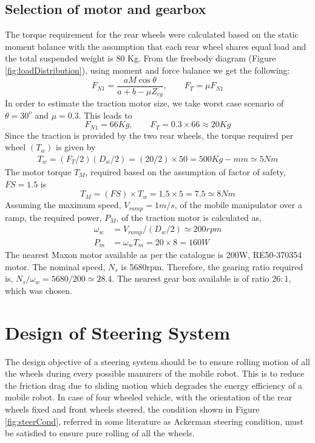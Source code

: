  \subsection {Selection of motor and gearbox}
 The torque requirement for the rear wheels were calculated based on the static moment balance with the assumption that each rear wheel shares equal load and the total suspended weight is 80 Kg. From the freebody diagram (Figure   \ref{fig:loadDistribution}), using moment and force balance  we get the following:
\begin{equation}
\label{eqn:t1}
F_{N1}=\frac{a M \cos \theta}{a+b-\mu Z_{cg}} , \quad \quad
F_T=\mu F_{N1}
\end{equation}
In order to estimate the traction motor size, we take worst case scenario of $\theta=30^o$ and $\mu =0.3$. This leads to
\begin{equation*}
F_{N1}=66 Kg, \quad\quad F_T=0.3\times 66 \approx 20Kg
\end{equation*}
 Since the traction is provided by the two rear wheels, the torque required per wheel $(T_w)$ is given by
\begin{eqnarray}
T_w=(F_T/2)(D_w/2)= (20/2) \times 50=500 Kg-mm \simeq 5 Nm
\end{eqnarray}
The motor torque $T_M$, required based on the assumption of factor of safety, $FS=1.5$ is
\begin{equation}
T_M=(FS)\times T_w=1.5\times 5 =7.5 \simeq 8Nm
\end{equation}
 Assuming the maximum speed, $V_{ramp}=1m/s$, of the mobile manipulator over a ramp, the required power, $P_M$, of the traction motor is calculated as,
 \begin{equation}
 \begin{aligned}
\omega_w&=V_{ramp}/(D_w/2) \simeq 200rpm\\
P_m&=\omega_w T_m=20\times 8=160W
 \end{aligned}
 \end{equation}
 The nearest Maxon motor available as per the catalogue \cite{catMaxon} is 200W,  RE50-370354 motor.  The nominal speed, $N_s$ is 5680rpm. Therefore, the  gearing  ratio required is, $N_s/\omega_w=5680/200 \simeq 28.4$. The nearest gear box available  is of ratio $26:1$, which was chosen. 

\section{Design of Steering System }
The design objective of a steering system should be to ensure rolling motion of all the  wheels during every possible manurers of the mobile robot. This is  to reduce the friction drag due to sliding motion which degrades the energy efficiency of a mobile robot. In case of four wheeled vehicle, with the orientation of the rear wheels fixed and front wheels steered, the condition   shown in Figure \ref{fig:steerCond},  referred in some literature as Ackerman steering condition, must be satisfied to ensure pure rolling of all the wheels.   

